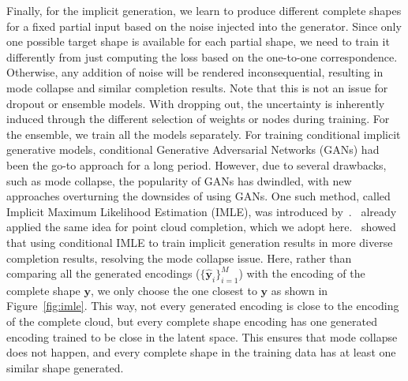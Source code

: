         Finally, for the implicit generation, we learn to produce different complete shapes for a fixed partial input based on the noise injected into the generator. Since only one possible target shape is available for each partial shape, we need to train it differently from just computing the loss based on the one-to-one correspondence. Otherwise, any addition of noise will be rendered inconsequential, resulting in mode collapse and similar completion results. Note that this is not an issue for dropout or ensemble models. With dropping out, the uncertainty is inherently induced through the different selection of weights or nodes during training. For the ensemble, we train all the models separately. For training conditional implicit generative models, conditional Generative Adversarial Networks (GANs) had been the go-to approach for a long period. However, due to several drawbacks, such as mode collapse, the popularity of GANs has dwindled, with new approaches overturning the downsides of using GANs. One such method, called Implicit Maximum Likelihood Estimation (IMLE), was introduced by~\cite{IMLE}.~\cite{PCCIMLE} already applied the same idea for point cloud completion, which we adopt here.~\cite{PCCIMLE} showed that using conditional IMLE to train implicit generation results in more diverse completion results, resolving the mode collapse issue. Here, rather than comparing all the generated encodings ($\{\mathbf{\hat{y}}_i\}_{i=1}^M$) with the encoding of the complete shape $\mathbf{y}$, we only choose the one closest to $\mathbf{y}$ as shown in Figure~\ref{fig:imle}. This way, not every generated encoding is close to the encoding of the complete cloud, but every complete shape encoding has one generated encoding trained to be close in the latent space. This ensures that mode collapse does not happen, and every complete shape in the training data has at least one similar shape generated.

